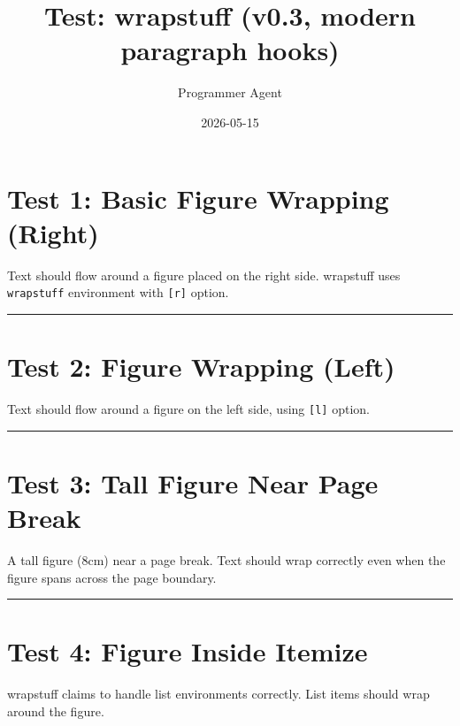 \documentclass[a4paper,11pt]{article}
\title{Test: wrapstuff (v0.3, modern paragraph hooks)}
\author{Programmer Agent}
\date{2026-05-15}
\begin{document}
\maketitle

\section*{Test 1: Basic Figure Wrapping (Right)}
Text should flow around a figure placed on the right side.
wrapstuff uses \verb|wrapstuff| environment with \verb|[r]| option.

\begin{wrapstuff}[r,width=0.35\linewidth,type=figure]
  \centering
  \rule{0.3\linewidth}{4cm}
  \caption{Right-wrapped figure.}
\end{wrapstuff}
\lipsum[1-2]

\section*{Test 2: Figure Wrapping (Left)}
Text should flow around a figure on the left side, using \verb|[l]| option.

\begin{wrapstuff}[l,width=0.35\linewidth,type=figure]
  \centering
  \rule{0.3\linewidth}{4cm}
  \caption{Left-wrapped figure.}
\end{wrapstuff}
\lipsum[3-4]

\section*{Test 3: Tall Figure Near Page Break}
A tall figure (8cm) near a page break. Text should wrap correctly
even when the figure spans across the page boundary.

\begin{wrapstuff}[r,width=0.35\linewidth,type=figure]
  \centering
  \rule{0.3\linewidth}{8cm}
  \caption{Tall figure spanning page break.}
\end{wrapstuff}
\lipsum[5-8]

\section*{Test 4: Figure Inside Itemize}
wrapstuff claims to handle list environments correctly.
List items should wrap around the figure.
\end{document}
